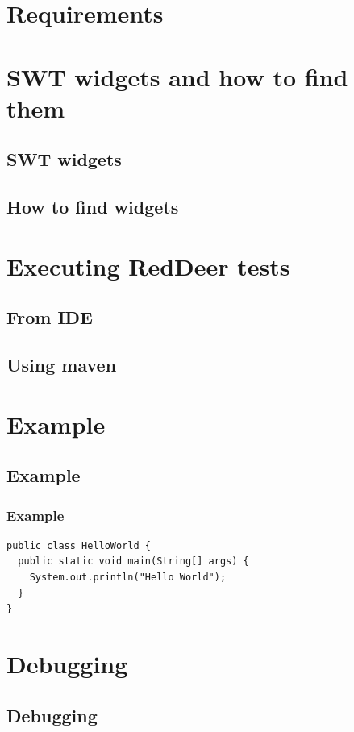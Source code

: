 \documentclass{beamer}
\begin{document}
\section{Requirements}


\section{SWT widgets and how to find them} 
\subsection{SWT widgets}
\subsection{How to find widgets}

\section{Executing RedDeer tests}
\subsection{From IDE}
\subsection{Using maven}


\section{Example}
\subsection{Example}
\begin{frame}[fragile]
\frametitle{Example}
\begin{lstlisting}
public class HelloWorld {
  public static void main(String[] args) {
    System.out.println("Hello World");
  }
}
\end{lstlisting}
\end{frame}

\section{Debugging}
\subsection{Debugging}
\end{document}
